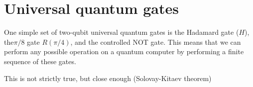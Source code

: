 \section{Universal quantum gates}
%
One simple set of two-qubit universal quantum gates is the Hadamard gate ($H$), the$\pi/8$ gate $R(\pi/4)$, and the controlled NOT gate. This means that we can perform any possible operation on a quantum computer by performing a finite sequence of these gates.

This is not strictly true, but close enough (Solovay-Kitaev theorem) 
%
%
